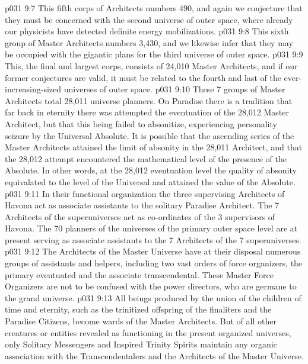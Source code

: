 \vs p031 9:7 \bibnobreakspace {} This fifth corps of Architects numbers 490, and again we conjecture that they must be concerned with the second universe of outer space, where already our physicists have detected definite energy mobilizations.
\vs p031 9:8 \bibnobreakspace {} This sixth group of Master Architects numbers 3,430, and we likewise infer that they may be occupied with the gigantic plans for the third universe of outer space.
\vs p031 9:9 \bibnobreakspace {} This, the final and largest corps, consists of 24,010 Master Architects, and if our former conjectures are valid, it must be related to the fourth and last of the ever\hyp{}increasing\hyp{}sized universes of outer space.
\vs p031 9:10 \pc These 7 groups of Master Architects total 28,011 universe planners. On Paradise there is a tradition that far back in eternity there was attempted the eventuation of the 28,012 Master Architect, but that this being failed to absonitize, experiencing personality seizure by the Universal Absolute. It is possible that the ascending series of the Master Architects attained the limit of absonity in the 28,011 Architect, and that the 28,012 attempt encountered the mathematical level of the presence of the Absolute. In other words, at the 28,012 eventuation level the quality of absonity equivalated to the level of the Universal and attained the value of the Absolute.
\vs p031 9:11 \pc In their functional organization the three supervising Architects of Havona act as associate assistants to the solitary Paradise Architect. The 7 Architects of the superuniverses act as co\hyp{}ordinates of the 3 supervisors of Havona. The 70 planners of the universes of the primary outer space level are at present serving as associate assistants to the 7 Architects of the 7 superuniverses.
\vs p031 9:12 The Architects of the Master Universe have at their disposal numerous groups of assistants and helpers, including two vast orders of force organizers, the primary eventuated and the associate transcendental. These Master Force Organizers are not to be confused with the power directors, who are germane to the grand universe.
\vs p031 9:13 All beings produced by the union of the children of time and eternity, such as the trinitized offspring of the finaliters and the Paradise Citizens, become wards of the Master Architects. But of all other creatures or entities revealed as functioning in the present organized universes, only Solitary Messengers and Inspired Trinity Spirits maintain any organic association with the Transcendentalers and the Architects of the Master Universe.
